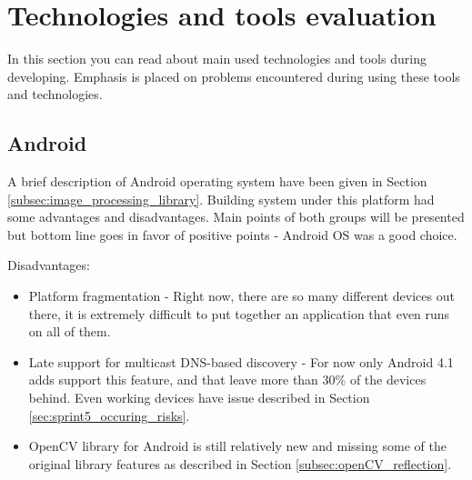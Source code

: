 \section{Technologies and tools evaluation}
In this section you can read about main used technologies and tools during developing.
Emphasis is placed on problems encountered during using these tools and technologies.

\subsection{Android}
A brief description of Android operating system have been given in Section \ref{subsec:image_processing_library}. Building system under this platform had some advantages and disadvantages. Main points of both groups will be presented but bottom line goes in favor of positive points - Android OS was a good choice.

Disadvantages:
\begin{itemize}
\item Platform fragmentation - Right now, there are so many different devices out there, it is extremely difficult to put together an application that even runs on all of them.
\item Late support for multicast DNS-based discovery - For now only Android 4.1 adds support this feature, and that leave more than 30\% of the devices behind. Even working devices have issue described in Section \ref{sec:sprint5_occuring_risks}.
\item OpenCV library for Android is still relatively new and missing some of the original library features as described in Section \ref{subsec:openCV_reflection}.
\end{itemize}

